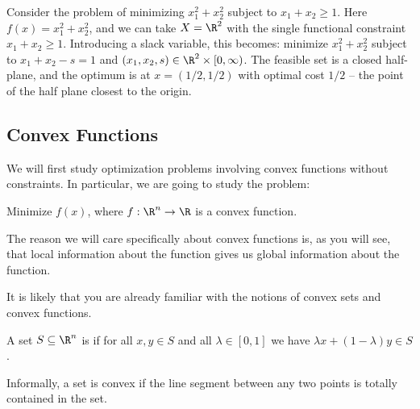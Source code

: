 \documentclass[a4paper]{scrartcl}
\begin{document}
\begin{example}
    Consider the problem of minimizing $x_1^2 + x_2^2$ subject to $x_1 + x_2 \geq 1$. Here $f(x) = x_1^2 + x_2^2$, and we can take $X = \R^2$ with the single functional constraint $x_1 + x_2 \geq 1$. Introducing a slack variable, this becomes: minimize $x_1^2 + x_2^2$ subject to $x_1 + x_2 - s = 1$ and $(x_1, x_2, s) \in \R^2 \times [0, \infty)$. The feasible set is a closed half-plane, and the optimum is at $x = (1/2, 1/2)$ with optimal cost $1/2$ -- the point of the half plane closest to the origin.
\end{example}

\subsection{Convex Functions}

We will first study optimization problems involving convex functions without constraints. In particular, we are going to study the problem:
\begin{center}
    Minimize $f(x)$, where $f : \R^n \rightarrow \R$ is a convex function.
\end{center}
The reason we will care specifically about convex functions is, as you will see, that local information about the function gives us global information about the function.

It is likely that you are already familiar with the notions of convex sets and convex functions.

\begin{definition}
    A set $S \subseteq \R^n$ is  if for all $x, y \in S$ and all $\lambda \in [0, 1]$ we have $\lambda x + (1 - \lambda) y \in S$.
\end{definition}

Informally, a set is convex if the line segment between any two points is totally contained in the set.

\begin{center}
\end{center}
\end{document}
